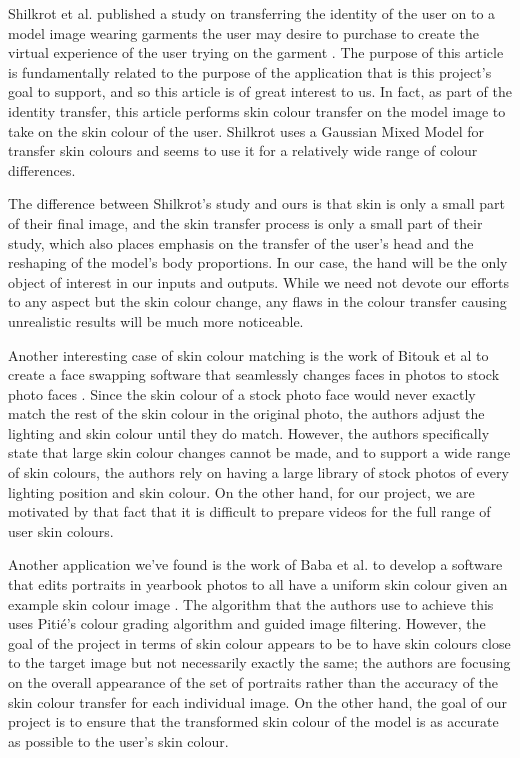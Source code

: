 Shilkrot et al. published a study on transferring the identity of the user on to a model image wearing garments the user may desire to purchase to create the virtual experience of the user trying on the garment \cite{shilkrot_2013_garment}. The purpose of this article is fundamentally related to the purpose of the application that is this project's goal to support, and so this article is of great interest to us. In fact, as part of the identity transfer, this article performs skin colour transfer on the model image to take on the skin colour of the user. Shilkrot uses a Gaussian Mixed Model for transfer skin colours and seems to use it for a relatively wide range of colour differences.

The difference between Shilkrot's study and ours is that skin is only a small part of their final image, and the skin transfer process is only a small part of their study, which also places emphasis on the transfer of the user's head and the reshaping of the model's body proportions. In our case, the hand will be the only object of interest in our inputs and outputs. While we need not devote our efforts to any aspect but the skin colour change, any flaws in the colour transfer causing unrealistic results will be much more noticeable. 

Another interesting case of skin colour matching is the work of Bitouk et al to create a face swapping software that seamlessly changes faces in photos to stock photo faces \cite{bitouk_2008_faceswap}. Since the skin colour of a stock photo face would never exactly match the rest of the skin colour in the original photo, the authors adjust the lighting and skin colour until they do match. However, the authors specifically state that large skin colour changes cannot be made, and to support a wide range of skin colours, the authors rely on having a large library of stock photos of every lighting position and skin colour. On the other hand, for our project, we are motivated by that fact that it is difficult to prepare videos for the full range of user skin colours.

Another application we've found is the work of Baba et al. to develop a software that edits portraits in yearbook photos to all have a uniform skin colour given an example skin colour image \cite{baba_2015_yearbook}. The algorithm that the authors use to achieve this uses Pitié's colour grading algorithm and guided image filtering. However, the goal of the project in terms of skin colour appears to be to have skin colours close to the target image but not necessarily exactly the same; the authors are focusing on the overall appearance of the set of portraits rather than the accuracy of the skin colour transfer for each individual image. On the other hand, the goal of our project is to ensure that the transformed skin colour of the model is as accurate as possible to the user's skin colour.

